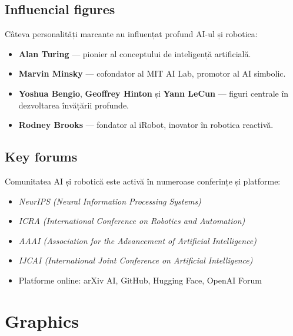 \documentclass[12pt, letterpaper]{article}
\begin{document}
\subsection*{Influencial figures}
Câteva personalități marcante au influențat profund AI-ul și robotica:
\begin{itemize}
    \item \textbf{Alan Turing} — pionier al conceptului de inteligență artificială.
    \item \textbf{Marvin Minsky} — cofondator al MIT AI Lab, promotor al AI simbolic.
    \item \textbf{Yoshua Bengio}, \textbf{Geoffrey Hinton} și \textbf{Yann LeCun} — figuri centrale în dezvoltarea învățării profunde.
    \item \textbf{Rodney Brooks} — fondator al iRobot, inovator în robotica reactivă.
\end{itemize}

\subsection*{Key forums}
Comunitatea AI și robotică este activă în numeroase conferințe și platforme:
\begin{itemize}
    \item \textit{NeurIPS (Neural Information Processing Systems)}
    \item \textit{ICRA (International Conference on Robotics and Automation)}
    \item \textit{AAAI (Association for the Advancement of Artificial Intelligence)}
    \item \textit{IJCAI (International Joint Conference on Artificial Intelligence)}
    \item Platforme online: arXiv AI, GitHub, Hugging Face, OpenAI Forum
\end{itemize}


\newpage
\section{Graphics}
\end{document}
